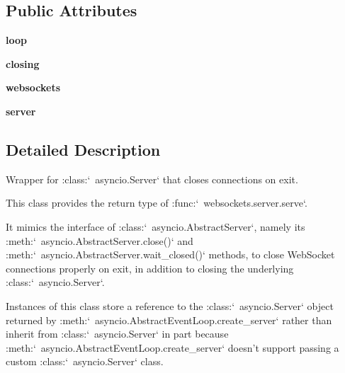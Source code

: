 \subsection*{Public Attributes}
\begin{DoxyCompactItemize}
\item 
\mbox{\label{classwebsockets_1_1server_1_1_web_socket_server_ac50a67194207e91a9b96b5aaeddce0ab}} 
{\bfseries loop}
\item 
\mbox{\label{classwebsockets_1_1server_1_1_web_socket_server_a7c095f358bb98e4074c83bb22b7f75cd}} 
{\bfseries closing}
\item 
\mbox{\label{classwebsockets_1_1server_1_1_web_socket_server_a04d867aadcbf46fc2d7352acdd2833d6}} 
{\bfseries websockets}
\item 
\mbox{\label{classwebsockets_1_1server_1_1_web_socket_server_aae3d6d1cd1e98ddfa90e9112d7339db5}} 
{\bfseries server}
\end{DoxyCompactItemize}


\subsection{Detailed Description}
\begin{DoxyVerb}Wrapper for :class:`~asyncio.Server` that closes connections on exit.

This class provides the return type of :func:`~websockets.server.serve`.

It mimics the interface of :class:`~asyncio.AbstractServer`, namely its
:meth:`~asyncio.AbstractServer.close()` and
:meth:`~asyncio.AbstractServer.wait_closed()` methods, to close WebSocket
connections properly on exit, in addition to closing the underlying
:class:`~asyncio.Server`.

Instances of this class store a reference to the :class:`~asyncio.Server`
object returned by :meth:`~asyncio.AbstractEventLoop.create_server` rather
than inherit from :class:`~asyncio.Server` in part because
:meth:`~asyncio.AbstractEventLoop.create_server` doesn't support passing a
custom :class:`~asyncio.Server` class.\end{DoxyVerb}
 

